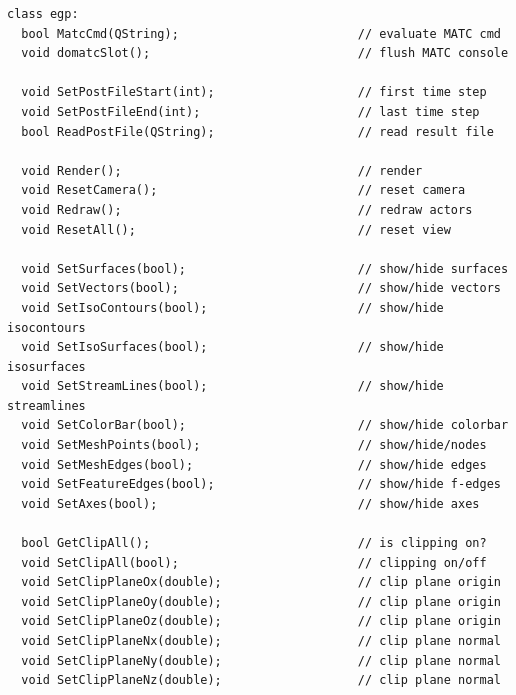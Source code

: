 \documentclass[a4paper,12pt]{article}
\begin{document}
\begin{footnotesize}
\begin{verbatim}
class egp:
  bool MatcCmd(QString);                         // evaluate MATC cmd
  void domatcSlot();                             // flush MATC console

  void SetPostFileStart(int);                    // first time step
  void SetPostFileEnd(int);                      // last time step
  bool ReadPostFile(QString);                    // read result file

  void Render();                                 // render
  void ResetCamera();                            // reset camera
  void Redraw();                                 // redraw actors
  void ResetAll();                               // reset view

  void SetSurfaces(bool);                        // show/hide surfaces
  void SetVectors(bool);                         // show/hide vectors
  void SetIsoContours(bool);                     // show/hide isocontours
  void SetIsoSurfaces(bool);                     // show/hide isosurfaces
  void SetStreamLines(bool);                     // show/hide streamlines
  void SetColorBar(bool);                        // show/hide colorbar
  void SetMeshPoints(bool);                      // show/hide/nodes
  void SetMeshEdges(bool);                       // show/hide edges
  void SetFeatureEdges(bool);                    // show/hide f-edges
  void SetAxes(bool);                            // show/hide axes

  bool GetClipAll();                             // is clipping on?
  void SetClipAll(bool);                         // clipping on/off
  void SetClipPlaneOx(double);                   // clip plane origin
  void SetClipPlaneOy(double);                   // clip plane origin
  void SetClipPlaneOz(double);                   // clip plane origin
  void SetClipPlaneNx(double);                   // clip plane normal
  void SetClipPlaneNy(double);                   // clip plane normal
  void SetClipPlaneNz(double);                   // clip plane normal


\end{verbatim}
\end{footnotesize}
\end{document}
